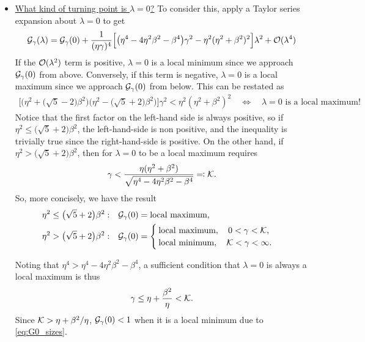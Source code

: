 \documentclass[a4paper,10pt]{article}
\begin{document}
{\begin{itemize}
\item \underline{What kind of turning point is $\lambda = 0$?} To consider this, apply a Taylor series expansion about $\lambda = 0$ to get
\begin{align}
\label{eq:G_taylor}
{\cal G}_{\gamma}(\lambda) 
= 
{\cal G}_{\gamma}(0) 
+
\frac{1}{(\eta \gamma)^4} 
\Big[ 
\big( \eta^4 - 4 \eta^2 \beta^2 - \beta^4 \big) \gamma^2  - \eta^2 (\eta^2 + \beta^2)^2 
\Big] \lambda^2
+ 
{\cal O}(\lambda^4)
\end{align}
If the ${\cal O}(\lambda^2)$ term is positive, $\lambda = 0$ is a local minimum since we approach ${\cal G}_{\gamma}(0)$ from above. Conversely, if this term is negative, $\lambda = 0$ is a local maximum since we approach ${\cal G}_{\gamma}(0)$ from below. This can be restated as
\begin{align}
\Big[ \big(\eta^2 + \big(\sqrt{5}-2 \big) \beta^2 \big) \big(\eta^2 - \big( \sqrt{5}+2 \big) \beta^2 \big) \Big] \gamma^2 < \eta^2 (\eta^2 + \beta^2)^2
\quad 
\Longleftrightarrow 
\quad
\lambda = 0 \textrm{ is a local maximum!}
\end{align}
Notice that the first factor on the left-hand side is always positive, so if $\eta^2 \leq \big(\sqrt{5}+2 \big) \beta^2$, the left-hand-side is non positive, and the inequality is trivially true since the right-hand-side is positive. On the other hand, if $\eta^2 > \big(\sqrt{5}+2 \big) \beta^2$, then for $\lambda = 0$ to be a local maximum requires
\begin{align}
\label{eq:Kdef}
\gamma < \frac{\eta (\eta^2 + \beta^2)}{\sqrt{\eta^4 - 4 \eta^2 \beta^2 - \beta^4}} \eqqcolon {\cal K}. 
\end{align}
So, more concisely, we have the result
\begin{equation}
\label{eq:G0_class}
\begin{aligned}
\eta^2 \leq \big(\sqrt{5}+2 \big) \beta^2:& 
\quad 
{\cal G}_{\gamma}(0) = \textrm{local maximum}, \\
\eta^2 > \big(\sqrt{5}+2 \big) \beta^2:&
\quad
{\cal G}_{\gamma}(0) = 
\begin{cases}
\textrm{local maximum}, \quad  0 < \gamma < {\cal K}, \\
\textrm{local minimum}, \quad  {\cal K} <  \gamma  < \infty.
\end{cases}
\end{aligned}
\end{equation}

Noting that $\eta^4 > \eta^4 - 4 \eta^2 \beta^2 - \beta^4$, a sufficient condition that $\lambda = 0$ is always a local maximum is thus
\begin{align} \label{eq:suff_0max}
\gamma \leq \eta + \frac{\beta^2}{\eta} < {\cal K}.
\end{align}
Since ${\cal K} > \eta + \beta^2 / \eta$, ${\cal G}_{\gamma}(0) < 1$ when it is a local minimum due to \eqref{eq:G0_sizes}.


\end{itemize}}
\end{document}
